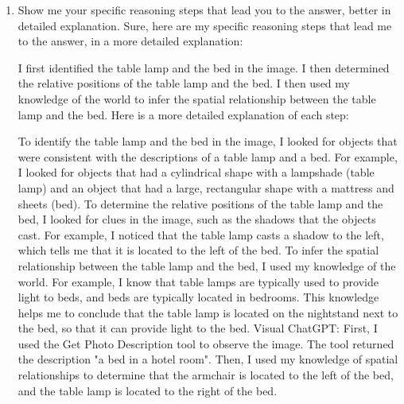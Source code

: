 \begin{enumerate}
    Here are some additional details about the spatial relationship between the table lamp and the bed:
    
    The table lamp is a small, portable lamp that is used to provide light.
    The bed is a piece of furniture that is used for sleeping.
    The table lamp is located on the nightstand, which is a small table that is typically located next to the bed.
    The nightstand is located next to the bed, meaning that it is close to the bed.
    I hope this helps! Let me know if you have any other questions.
    \subitem Visual ChatGPT: The table lamp is located to the right of the bed.
    \item Show me your specific reasoning steps that lead you to the answer, better in detailed explanation.
    \subitem 
    Sure, here are my specific reasoning steps that lead me to the answer, in a more detailed explanation:
    
    I first identified the table lamp and the bed in the image.
    I then determined the relative positions of the table lamp and the bed.
    I then used my knowledge of the world to infer the spatial relationship between the table lamp and the bed.
    Here is a more detailed explanation of each step:
    
    To identify the table lamp and the bed in the image, I looked for objects that were consistent with the descriptions of a table lamp and a bed. For example, I looked for objects that had a cylindrical shape with a lampshade (table lamp) and an object that had a large, rectangular shape with a mattress and sheets (bed).
    To determine the relative positions of the table lamp and the bed, I looked for clues in the image, such as the shadows that the objects cast. For example, I noticed that the table lamp casts a shadow to the left, which tells me that it is located to the left of the bed.
    To infer the spatial relationship between the table lamp and the bed, I used my knowledge of the world. For example, I know that table lamps are typically used to provide light to beds, and beds are typically located in bedrooms. This knowledge helps me to conclude that the table lamp is located on the nightstand next to the bed, so that it can provide light to the bed.
    \subitem Visual ChatGPT: First, I used the Get Photo Description tool to observe the image. The tool returned the description "a bed in a hotel room". Then, I used my knowledge of spatial relationships to determine that the armchair is located to the left of the bed, and the table lamp is located to the right of the bed.
\end{enumerate}
